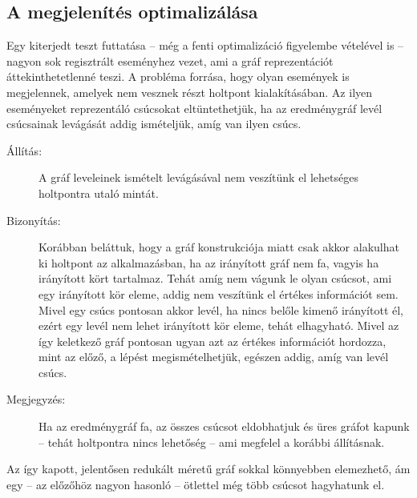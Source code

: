     \vfill
    
    \subsection{A megjelenítés optimalizálása}
    Egy kiterjedt teszt futtatása -- még a fenti optimalizáció figyelembe vételével is --nagyon sok regisztrált eseményhez vezet, ami a gráf reprezentációt áttekinthetetlenné teszi. A probléma forrása, hogy olyan események is megjelennek, amelyek nem vesznek részt holtpont kialakításában. Az ilyen eseményeket reprezentáló csúcsokat eltüntethetjük, ha az eredménygráf levél csúcsainak levágását addig ismételjük, amíg van ilyen csúcs.
    
    \begin{description}
        \item[Állítás:] A gráf leveleinek ismételt levágásával nem veszítünk el lehetséges holtpontra utaló mintát.
        \item[Bizonyítás:] Korábban beláttuk, hogy a gráf konstrukciója miatt csak akkor alakulhat ki holtpont az alkalmazásban, ha az irányított gráf nem fa, vagyis ha irányított kört tartalmaz. Tehát amíg nem vágunk le olyan csúcsot, ami egy irányított kör eleme, addig nem veszítünk el értékes információt sem. Mivel egy csúcs pontosan akkor levél, ha nincs belőle kimenő irányított él, ezért egy levél nem lehet irányított kör eleme, tehát elhagyható. Mivel az így keletkező gráf pontosan ugyan azt az értékes információt hordozza, mint az előző, a lépést megismételhetjük, egészen addig, amíg van levél csúcs.
        \item[Megjegyzés:] Ha az eredménygráf fa, az összes csúcsot eldobhatjuk és üres gráfot kapunk -- tehát holtpontra nincs lehetőség -- ami megfelel a korábbi állításnak.
    \end{description}
%    
    Az így kapott, jelentősen redukált méretű gráf sokkal könnyebben elemezhető, ám egy -- az előzőhöz nagyon hasonló -- ötlettel még több csúcsot hagyhatunk el.
    

